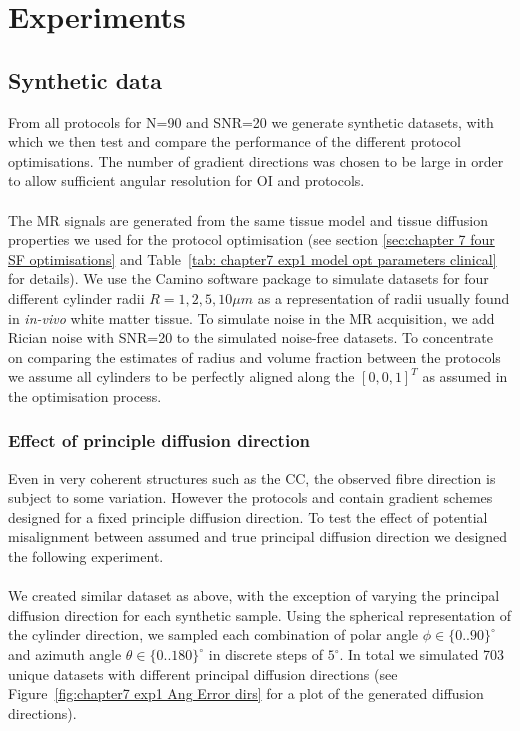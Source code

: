 \section{Experiments}
\subsection{Synthetic data}
From all protocols for N=90 and SNR=20 we generate synthetic datasets, with which we then test and compare the performance of the different protocol optimisations. The number of gradient directions was chosen to be large in order to allow sufficient angular resolution for {\gls{OI}} and {\DO} protocols.
\paragraph{}
\label{sec: chapter 6 fibre distribution perfect}
The MR signals are generated from the same tissue model and tissue diffusion properties we used for the protocol optimisation (see section \ref{sec:chapter 7 four SF optimisations} and Table~\ref{tab: chapter7 exp1 model opt parameters clinical} for details). We use the Camino software package \citep{Cook:2006} to simulate datasets for four different cylinder radii $R={1,2,5,10}\mu m$ as a representation of radii usually found in \emph{in-vivo} white matter tissue. To simulate noise in the MR acquisition, we add Rician noise with SNR=20 to the simulated noise-free datasets. To concentrate on comparing the estimates of radius and volume fraction between the protocols we assume all cylinders to be perfectly aligned along the $[0,0,1]^T$ as assumed in the optimisation process.

\subsubsection{Effect of principle diffusion direction}
Even in very coherent structures such as the \gls{CC}, the observed fibre direction is subject to some variation. However the protocols {\FD} and {\DO} contain gradient schemes designed for a fixed principle diffusion direction. To test the effect of potential misalignment between assumed and true principal diffusion direction we designed the following experiment.
\paragraph{}
We created similar dataset as above, with the exception of varying the principal diffusion direction for each synthetic sample. Using the spherical representation of the cylinder direction, we sampled each combination of polar angle $\phi \in \{0..90\}^\circ$ and azimuth angle $\theta \in \{0..180\}^\circ$ in discrete steps of $5^\circ$. In total we simulated 703 unique datasets with different principal diffusion directions (see Figure~\ref{fig:chapter7 exp1 Ang Error dirs} for a plot of the generated diffusion directions).
\bgroup
\tikzset{use png}


